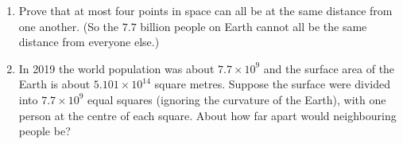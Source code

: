 \begin{enumerate}
\item[(a)] Prove that at most four points in space can all be at the same distance from one another. (So the $7.7$ billion people on Earth cannot all be the same distance from everyone else.)
\item[(b)] In 2019 the world population was about $7.7\times10^{9}$ and the surface area of the Earth is about $5.101\times10^{14}$ square metres. Suppose the surface were divided into $7.7\times10^9$ equal squares (ignoring the curvature of the Earth), with one person at the centre of each square. About how far apart would neighbouring people be?
\end{enumerate}
